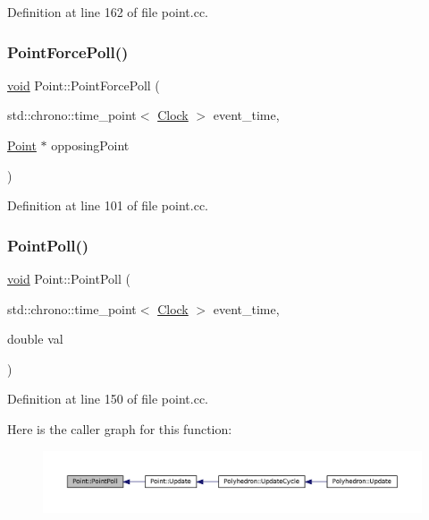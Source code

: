 Definition at line 162 of file point.\+cc.

\mbox{\label{class_point_a414f2215f758cd69fa67e8135ecc4fe2}} 
\subsubsection{\texorpdfstring{Point\+Force\+Poll()}{PointForcePoll()}}
{\footnotesize\ttfamily \mbox{\hyperlink{glad_8h_a950fc91edb4504f62f1c577bf4727c29}{void}} Point\+::\+Point\+Force\+Poll (\begin{DoxyParamCaption}\item[{std\+::chrono\+::time\+\_\+point$<$ \mbox{\hyperlink{universe_8h_a0ef8d951d1ca5ab3cfaf7ab4c7a6fd80}{Clock}} $>$}]{event\+\_\+time,  }\item[{\mbox{\hyperlink{class_point}{Point}} $\ast$}]{opposing\+Point }\end{DoxyParamCaption})}



Definition at line 101 of file point.\+cc.

\mbox{\label{class_point_a026fcbc22b4667e74fea48a9dc6eeb61}} 
\subsubsection{\texorpdfstring{Point\+Poll()}{PointPoll()}}
{\footnotesize\ttfamily \mbox{\hyperlink{glad_8h_a950fc91edb4504f62f1c577bf4727c29}{void}} Point\+::\+Point\+Poll (\begin{DoxyParamCaption}\item[{std\+::chrono\+::time\+\_\+point$<$ \mbox{\hyperlink{universe_8h_a0ef8d951d1ca5ab3cfaf7ab4c7a6fd80}{Clock}} $>$}]{event\+\_\+time,  }\item[{double}]{val }\end{DoxyParamCaption})}



Definition at line 150 of file point.\+cc.

Here is the caller graph for this function\+:\nopagebreak
\begin{figure}[H]
\begin{center}
\leavevmode
\includegraphics[width=350pt]{class_point_a026fcbc22b4667e74fea48a9dc6eeb61_icgraph}
\end{center}
\end{figure}
\mbox{\label{class_point_a123c78bef71f74d71bc833709a38709c}} 
